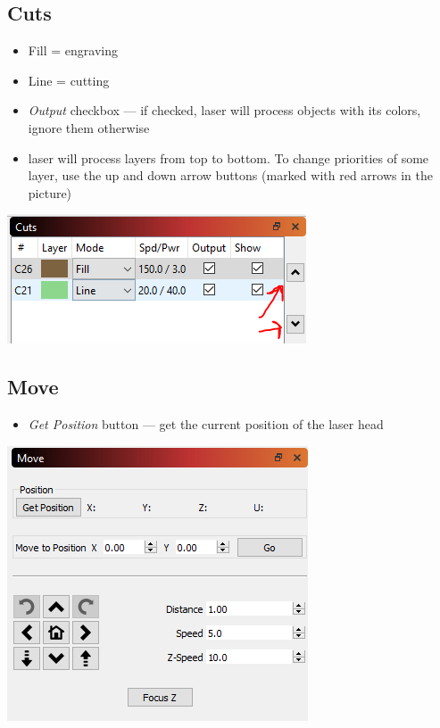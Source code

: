 \documentclass[fleqn]{article}
\begin{document}
\subsection{Cuts}
\setlength{\columnseprule}{0pt}
\begin{multicols}{2}\setlength{\parindent}{1em}
	\begin{itemize}
		\item Fill = engraving
		\item Line = cutting
		\item  \textit{Output} checkbox --- if checked, laser will process objects with its colors, ignore them otherwise
		\item laser will process layers from top to bottom. To change priorities of some layer, use the up and down arrow buttons (marked with red arrows in the picture)
	\end{itemize}
	\vfill\null
	
	\columnbreak
	\includegraphics{imgs/laser_cutscard.png}
	
\end{multicols}

\subsection{Move}
\setlength{\columnseprule}{0pt}
\begin{multicols}{2}\setlength{\parindent}{1em}
	\begin{itemize}
		\item  \textit{Get Position} button --- get the current position of the laser head
	\end{itemize}
	\vfill\null
	
	\columnbreak
	\includegraphics{imgs/laser_movecard.png}
	
\end{multicols}
\end{document}
